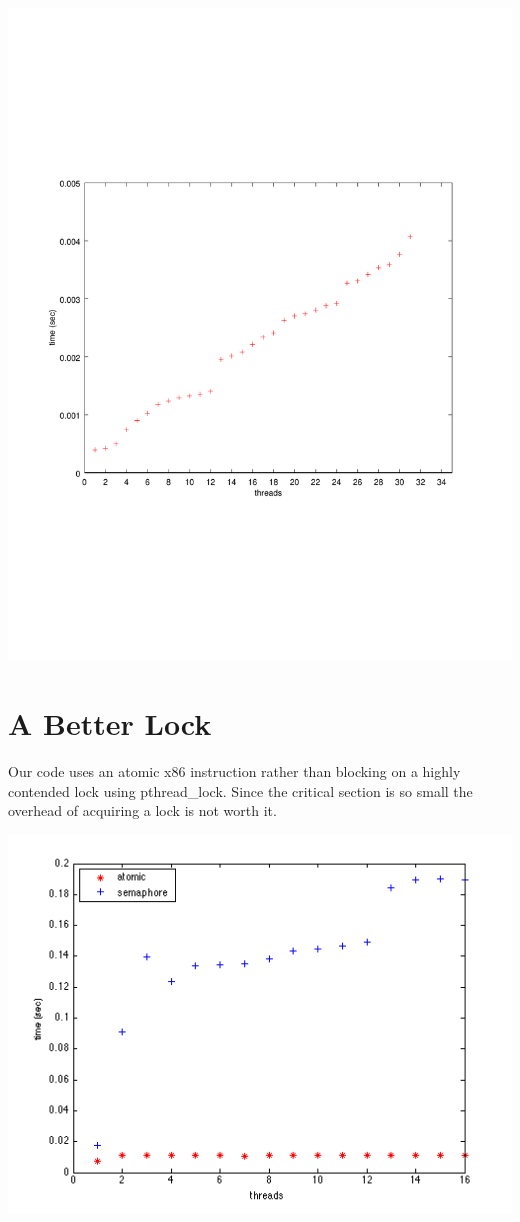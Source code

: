 \documentclass[10pt]{article}
\begin{document}
\begin{center}
\includegraphics[scale=0.50]{images/smt}
\end{center}

\section*{A Better Lock}
Our code uses an atomic x86 instruction rather than blocking on a highly
contended lock using pthread\_lock.
Since the critical section is so small the overhead of acquiring a lock is not
worth it.
\begin{center}
\includegraphics[scale=0.50]{images/lock}
\end{center}
\end{document}
